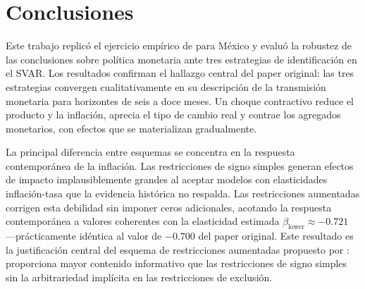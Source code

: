 \documentclass[12pt,a4paper]{article}
\newcommand{\blower}{\beta_{\text{lower}}}
\begin{document}
\section{Conclusiones}
\label{sec:conclusiones}

Este trabajo replicó el ejercicio empírico de \citet{carrilloelizondo2018} para México
y evaluó la robustez de las conclusiones sobre política monetaria ante tres estrategias
de identificación en el SVAR.
Los resultados confirman el hallazgo central del paper original: las tres estrategias
convergen cualitativamente en su descripción de la transmisión monetaria para horizontes
de seis a doce meses.
Un choque contractivo reduce el producto y la inflación, aprecia el tipo de cambio real
y contrae los agregados monetarios, con efectos que se materializan gradualmente.

La principal diferencia entre esquemas se concentra en la respuesta contemporánea de la
inflación.
Las restricciones de signo simples generan efectos de impacto implausiblemente grandes
al aceptar modelos con elasticidades inflación-tasa que la evidencia histórica no
respalda.
Las restricciones aumentadas corrigen esta debilidad sin imponer ceros adicionales,
acotando la respuesta contemporánea a valores coherentes con la elasticidad estimada
$\blower \approx -0.721$ —prácticamente idéntica al valor de $-0.700$ del paper
original.
Este resultado es la justificación central del esquema de restricciones aumentadas
propuesto por \citet{carrilloelizondo2018}: proporciona mayor contenido informativo
que las restricciones de signo simples sin la arbitrariedad implícita en las
restricciones de exclusión.



\end{document}
